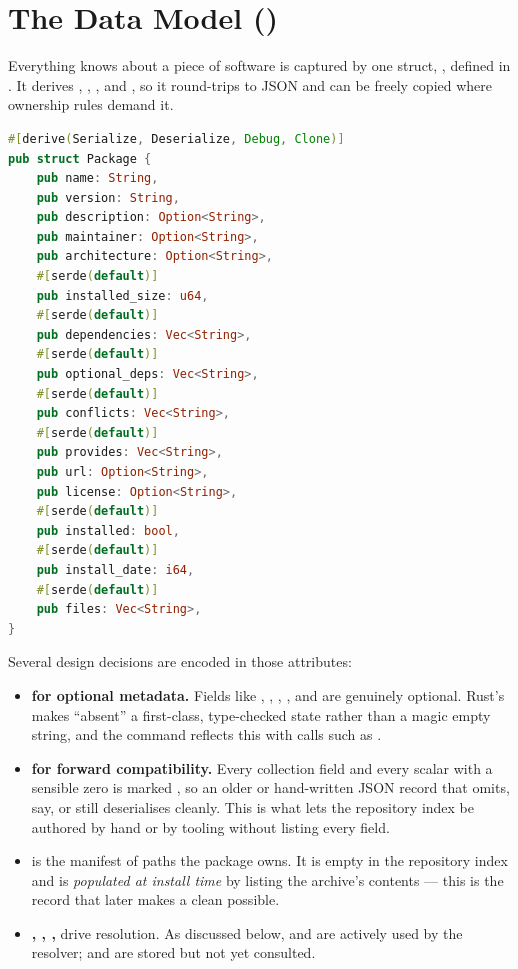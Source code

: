 \section{The Data Model ()}

Everything  knows about a piece of software is captured by one struct, , defined in . It derives , , , and , so it round-trips to JSON and can be freely copied where ownership rules demand it.

\begin{lstlisting}[language=Rust, caption={\file{model.rs} --- the \code{Package} struct}]
#[derive(Serialize, Deserialize, Debug, Clone)]
pub struct Package {
    pub name: String,
    pub version: String,
    pub description: Option<String>,
    pub maintainer: Option<String>,
    pub architecture: Option<String>,
    #[serde(default)]
    pub installed_size: u64,
    #[serde(default)]
    pub dependencies: Vec<String>,
    #[serde(default)]
    pub optional_deps: Vec<String>,
    #[serde(default)]
    pub conflicts: Vec<String>,
    #[serde(default)]
    pub provides: Vec<String>,
    pub url: Option<String>,
    pub license: Option<String>,
    #[serde(default)]
    pub installed: bool,
    #[serde(default)]
    pub install_date: i64,
    #[serde(default)]
    pub files: Vec<String>,
}
\end{lstlisting}

Several design decisions are encoded in those attributes:

\begin{itemize}
  \item \textbf{ for optional metadata.} Fields like , , , , and  are genuinely optional. Rust's  makes ``absent'' a first-class, type-checked state rather than a magic empty string, and the  command reflects this with calls such as .
  \item \textbf{ for forward compatibility.} Every collection field and every scalar with a sensible zero is marked , so an older or hand-written JSON record that omits, say,  or  still deserialises cleanly. This is what lets the repository index be authored by hand or by tooling without listing every field.
  \item \textbf{} is the manifest of paths the package owns. It is empty in the repository index and is \emph{populated at install time} by listing the archive's contents --- this is the record that later makes a clean  possible.
  \item \textbf{, , , } drive resolution. As discussed below,  and  are actively used by the resolver;  and  are stored but not yet consulted.
\end{itemize}

